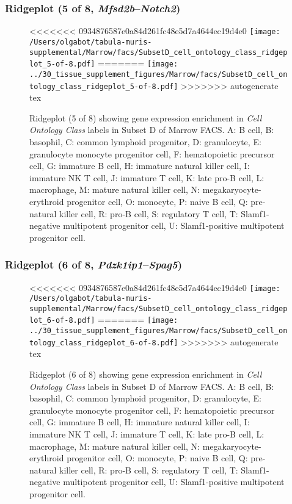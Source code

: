 \clearpage

\subsubsection{Ridgeplot (5 of 8, \emph{Mfsd2b}--\emph{Notch2})}
\begin{figure}[h]
\centering
<<<<<<< 0934876587e0a84d261fc48e5d7a4644ec19d4e0
\texttt{[image: /Users/olgabot/tabula-muris-supplemental/Marrow/facs/SubsetD\_cell\_ontology\_class\_ridgeplot\_5-of-8.pdf]}
=======
\texttt{[image: ../30\_tissue\_supplement\_figures/Marrow/facs/SubsetD\_cell\_ontology\_class\_ridgeplot\_5-of-8.pdf]}
>>>>>>> autogenerate tex

\caption{ Ridgeplot (5 of 8)  showing gene expression enrichment in \emph{Cell Ontology Class} labels in Subset D of Marrow FACS. A: B cell, B: basophil, C: common lymphoid progenitor, D: granulocyte, E: granulocyte monocyte progenitor cell, F: hematopoietic precursor cell, G: immature B cell, H: immature natural killer cell, I: immature NK T cell, J: immature T cell, K: late pro-B cell, L: macrophage, M: mature natural killer cell, N: megakaryocyte-erythroid progenitor cell, O: monocyte, P: naive B cell, Q: pre-natural killer cell, R: pro-B cell, S: regulatory T cell, T: Slamf1-negative multipotent progenitor cell, U: Slamf1-positive multipotent progenitor cell.}
\end{figure}


\clearpage

\subsubsection{Ridgeplot (6 of 8, \emph{Pdzk1ip1}--\emph{Spag5})}
\begin{figure}[h]
\centering
<<<<<<< 0934876587e0a84d261fc48e5d7a4644ec19d4e0
\texttt{[image: /Users/olgabot/tabula-muris-supplemental/Marrow/facs/SubsetD\_cell\_ontology\_class\_ridgeplot\_6-of-8.pdf]}
=======
\texttt{[image: ../30\_tissue\_supplement\_figures/Marrow/facs/SubsetD\_cell\_ontology\_class\_ridgeplot\_6-of-8.pdf]}
>>>>>>> autogenerate tex

\caption{ Ridgeplot (6 of 8)  showing gene expression enrichment in \emph{Cell Ontology Class} labels in Subset D of Marrow FACS. A: B cell, B: basophil, C: common lymphoid progenitor, D: granulocyte, E: granulocyte monocyte progenitor cell, F: hematopoietic precursor cell, G: immature B cell, H: immature natural killer cell, I: immature NK T cell, J: immature T cell, K: late pro-B cell, L: macrophage, M: mature natural killer cell, N: megakaryocyte-erythroid progenitor cell, O: monocyte, P: naive B cell, Q: pre-natural killer cell, R: pro-B cell, S: regulatory T cell, T: Slamf1-negative multipotent progenitor cell, U: Slamf1-positive multipotent progenitor cell.}
\end{figure}


